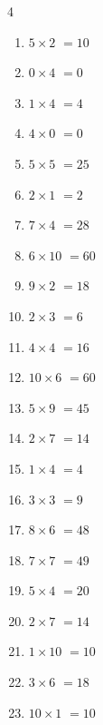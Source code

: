 \begin{multicols}{4}
\begin{enumerate}
  \item $5\times 2$
        $=10$

  \item $0\times 4$
        $=0$

  \item $1\times 4$
        $=4$

  \item $4\times 0$
        $=0$

  \item $5\times 5$
        $=25$

  \item $2\times 1$
        $=2$

  \item $7\times 4$
        $=28$

  \item $6\times 10$
        $=60$

  \item $9\times 2$
        $=18$

  \item $2\times 3$
        $=6$

  \item $4\times 4$
        $=16$

  \item $10\times 6$
        $=60$

  \item $5\times 9$
        $=45$

  \item $2\times 7$
        $=14$

  \item $1\times 4$
        $=4$

  \item $3\times 3$
        $=9$

  \item $8\times 6$
        $=48$

  \item $7\times 7$
        $=49$

  \item $5\times 4$
        $=20$

  \item $2\times 7$
        $=14$

  \item $1\times 10$
        $=10$

  \item $3\times 6$
        $=18$

  \item $10\times 1$
        $=10$


\end{enumerate}
\end{multicols}
